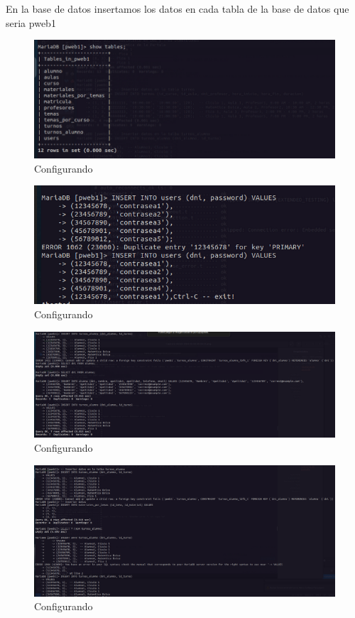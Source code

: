 En la base de datos insertamos los datos en cada tabla de la base de datos que seria pweb1
\begin{figure}[H]
  \centering
  \includegraphics[width=1.0\textwidth]{img/Tablas_pweb1.png}
  \caption{Configurando}
\end{figure}
\begin{figure}[H]
  \centering
  \includegraphics[width=1.0\textwidth]{img/Insertamosdatos_MariaDB.png}
  \caption{Configurando}
\end{figure}
\begin{figure}[H]
  \centering
  \includegraphics[width=1.0\textwidth]{img/Insertando_Datos_1.png}
  \caption{Configurando}
\end{figure}
\begin{figure}[H]
  \centering
  \includegraphics[width=1.0\textwidth]{img/Insertando_Datos_2.png}
  \caption{Configurando}
\end{figure}
